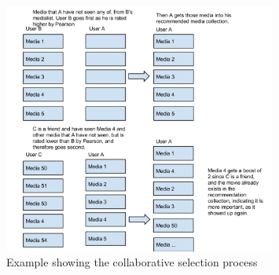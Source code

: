 \begin{figure}[htb]
\centering
\includegraphics[width=0.8\textwidth]{Images/CollaborativeRecExample.png}
\caption{Example showing the collaborative selection process}
\label{CollaEx}
\end{figure}